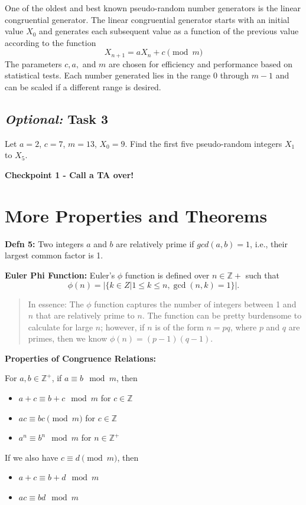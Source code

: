 \documentclass[12pt,letterpaper]{article}
\newcommand\Z{\mathbb Z}
\begin{document}
One of the oldest and best known pseudo-random number generators is the linear congruential generator. The linear congruential generator starts with an initial value $X_0$ and generates each subsequent value as a function of the previous value according to the function
\begin{equation*}
    X_{n+1}=aX_n+c \pmod m
\end{equation*}
The parameters $c, a,$ and $m$ are chosen for efficiency and performance based on statistical tests. Each number generated lies in the range $0$ through $m - 1$ and can be scaled if a different range is desired.

\subsection*{\textit{Optional:} Task 3}

\item Let $a=2$, $c=7$, $m=13$, $X_0 = 9$. Find the first five pseudo-random integers $X_1$ to $X_5$.

\begin{mdframed} \vspace{4cm} \end{mdframed}

\textbf{Checkpoint 1 - Call a TA over!}

\newpage
   \section*{More Properties and Theorems}
	
	\textbf{Defn 5:} Two integers $a$ and $b$ are relatively prime if $gcd(a, b) = 1$, i.e., their largest common factor is 1.
	
	\textbf{Euler Phi Function:} Euler’s $\phi$ function is defined over $n \in \Z+$ such that 
	\[ \phi(n) = |\{k \in Z|  1 \leq k \leq n, \gcd(n, k) = 1\}|. \]
    
    \begin{quote}
    In essence: The $\phi$ function captures the number of integers between 1 and $n$ that are relatively prime to
    $n$. The function can be pretty burdensome to calculate for large $n$; however, if $n$ is of
    the form $n = pq$, where $p$ and $q$ are primes, then we know $\phi(n) = (p-1)(q-1)$.
    \end{quote}

\textbf{Properties of Congruence Relations:}

For $a,b \in \mathbb{Z}^+$, if $a \equiv b \mod{m}$, then
\begin{itemize}
    \item $a + c\equiv b + c\mod{m}$ for $c \in \mathbb{Z}$
    \item $ac \equiv bc \pmod{m}$ for $c \in \mathbb{Z}$
    \item $a^n \equiv b^n \mod{m}$ for $n \in \mathbb{Z^+}$ 
\end{itemize}
If we also have $c \equiv d \pmod{m}$, then
\begin{itemize}
    \item $a + c\equiv b + d\mod{m}$
    \item $ac\equiv bd\mod{m}$
\end{itemize}
\end{document}
